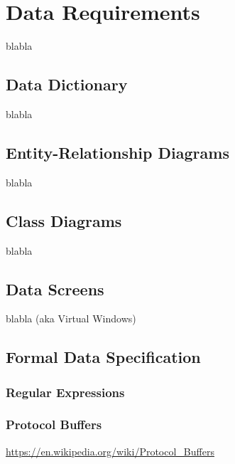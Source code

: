 
\chapter{Data Requirements}%
blabla


\section{Data Dictionary}
blabla

\section{Entity-Relationship Diagrams}
blabla

\section{Class Diagrams}
blabla

\section{Data Screens}
blabla  (aka Virtual Windows)

\section{Formal Data Specification}%

\subsection{Regular Expressions}

\subsection{Protocol Buffers}

\url{https://en.wikipedia.org/wiki/Protocol_Buffers}
